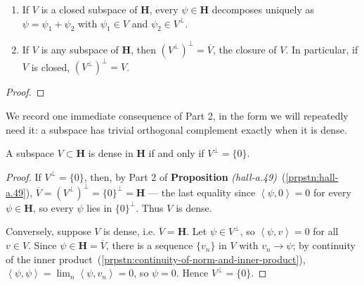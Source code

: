 \begin{proposition}
    \label{prpstn:hall-a.49}
    \leanok
    \begin{enumerate}
        \item If $V$ is a closed subspace of $\mathbf{H}$, every $\psi \in \mathbf{H}$ decomposes uniquely as $\psi = \psi_1 + \psi_2$ with $\psi_1 \in V$ and $\psi_2 \in V^\perp$.
        \item If $V$ is any subspace of $\mathbf{H}$, then $(V^\perp)^\perp = \overline{V}$, the closure of $V$. In particular, if $V$ is closed, $(V^\perp)^\perp = V$.
    \end{enumerate}
\end{proposition}
\begin{proof}
\leanok
\end{proof}

We record one immediate consequence of Part 2, in the form we will repeatedly need it: a subspace has trivial orthogonal complement exactly when it is dense.

\begin{corollary}
    \label{crllr:trivial-complement-characterizes-density}
    \leanok
    A subspace $V \subset \mathbf{H}$ is dense in $\mathbf{H}$ if and only if $V^\perp = \{0\}$.
\end{corollary}
\begin{proof}
    \leanok
If $V^\perp = \{0\}$, then, by Part 2 of \textbf{Proposition} \textit{(hall-a.49)}~(\ref{prpstn:hall-a.49}), $\overline{V} = (V^\perp)^\perp = \{0\}^\perp = \mathbf{H}$ — the last equality since $\left< \psi, 0 \right> = 0$ for every $\psi \in \mathbf{H}$, so every $\psi$ lies in $\{0\}^\perp$. Thus $V$ is dense.

Conversely, suppose $V$ is dense, i.e. $\overline{V} = \mathbf{H}$. Let $\psi \in V^\perp$, so $\left< \psi, v \right> = 0$ for all $v \in V$. Since $\psi \in \mathbf{H} = \overline{V}$, there is a sequence $\{v_n\}$ in $V$ with $v_n \to \psi$; by continuity of the inner product~(\ref{prpstn:continuity-of-norm-and-inner-product}), $\left< \psi, \psi \right> = \lim_n \left< \psi, v_n \right> = 0$, so $\psi = 0$. Hence $V^\perp = \{0\}$.
\end{proof}

